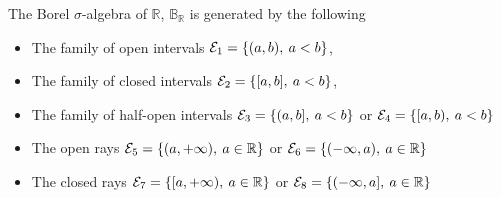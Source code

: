 \documentclass[../../main.tex]{subfiles}
\begin{document}
\providecommand{\borel}{\mathbb{B}_{\mathbb{R}}}
\providecommand{\gen}[1]{\mathcal{M}(\mathcal{E}_{#1})}
\begin{wts}
    The Borel $\sigma$-algebra of $\mathbb{R}$, $\borel$ is generated by the following
    \begin{itemize}
        \item The family of open intervals $\cal{E}_1=\{(a,b),\:a<b\}$,
        \item The family of closed intervals $\cal{E}_2=\{[a,b],\:a<b\}$,
        \item The family of half-open intervals $\cal{E}_3=\{(a,b],\:a<b\}$ or $\cal{E}_4=\{[a,b),\:a<b\}$
        \item The open rays $\cal{E}_5=\{(a,+\infty),\:a\in\mathbb{R}\}$ or $\cal{E}_6=\{(-\infty,a),\:a\in\mathbb{R}\}$
        \item The closed rays
        $\cal{E}_7=\{[a,+\infty),\:a\in\mathbb{R}\}$ or
        $\cal{E}_8=\{(-\infty,a],\:a\in\mathbb{R}\}$
    \end{itemize}
\end{wts}
\end{document}
